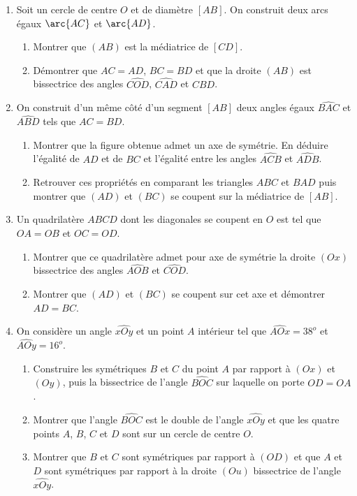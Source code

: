 \begin{enumerate}
\begin{enumerate}
\end{enumerate}
\item Soit un cercle de centre $O$ et de diamètre $[AB]$. On construit deux arcs
égaux $\arc{AC}$ et $\arc{AD}$. \begin{enumerate}
\item Montrer que $(AB)$ est la médiatrice de $[CD]$.
\item Démontrer que $AC=AD$, $BC=BD$ et que la droite $(AB)$ est bissectrice des 
angles $\widehat{COD}$, $\widehat{CAD}$ et $\widehat{CBD}$. 
\end{enumerate}
\item On construit d'un même côté d'un segment $[AB]$ deux angles égaux 
$\widehat{BAC}$ et $\widehat{ABD}$ tels que $AC=BD$. \begin{enumerate}
\item Montrer que la figure obtenue admet un axe de symétrie. En déduire l'égalité de 
$AD$ et de $BC$ et l'égalité entre les angles $\widehat{ACB}$ et $\widehat{ADB}$.
\item Retrouver ces propriétés en comparant les triangles $ABC$ et $BAD$ puis montrer
que $(AD)$ et $(BC)$ se coupent sur la médiatrice de $[AB]$. 
\end{enumerate}
\item Un quadrilatère $ABCD$ dont les diagonales se coupent en $O$ est tel que $OA=OB$ et $OC=OD$. \begin{enumerate}
\item Montrer que ce quadrilatère admet pour axe de symétrie la droite $(Ox)$ bissectrice des angles $\widehat{AOB}$ et $\widehat{COD}$. 
\item Montrer que $(AD)$ et $(BC)$ se coupent sur cet axe et démontrer $AD=BC$.
\end{enumerate}
\item On considère un angle $\widehat{xOy}$ et un point $A$ intérieur tel que $\widehat{AOx}=38^o$ et $\widehat{AOy}= 16^o$. \begin{enumerate}
\item Construire les symétriques $B$ et $C$ du point $A$ par rapport à $(Ox)$ et $(Oy)$, puis la bissectrice de l'angle $\widehat{BOC}$ sur laquelle on porte $OD=OA$. 
\item Montrer que l'angle $\widehat{BOC}$ est le double de l'angle $\widehat{xOy}$
et que les quatre points $A$, $B$, $C$ et $D$ sont sur un cercle de centre $O$. 
\item Montrer que $B$ et $C$ sont symétriques par rapport à $(OD)$ 
et que $A$ et $D$ sont symétriques par rapport à la droite $(Ou)$ bissectrice de l'angle $\widehat{xOy}$. 
\end{enumerate}
\end{enumerate}